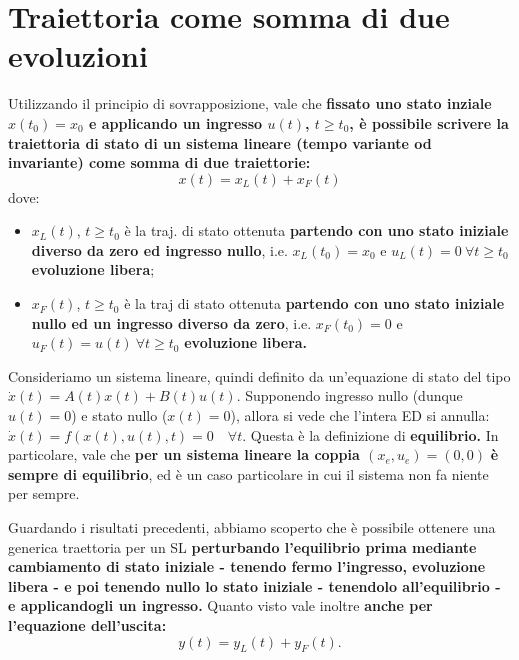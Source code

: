\documentclass[a4paper]{report}
\begin{document}
\section{Traiettoria come somma di due evoluzioni}
\begin{defin}{}{}
Utilizzando il principio di sovrapposizione, vale che \textbf{fissato uno stato inziale $x(t_0) = x_0$ e applicando un ingresso $u(t)$, $t \geq t_0$, è possibile scrivere la traiettoria di stato di un sistema lineare (tempo variante od invariante) come somma di due traiettorie:}
\begin{equation}
	x(t) = x_L(t) +x_F(t)
\end{equation}
dove:
\begin{itemize}
	\item  $x_L(t)$, $t \geq t_0$ è la traj. di stato ottenuta \textbf{partendo con uno stato iniziale diverso da zero ed ingresso nullo}, i.e. $x_L(t_0) = x_0$ e $u_L(t) = 0 \ \forall t \geq t_0$ \rarr \textbf{evoluzione libera};
	\item $x_F(t)$, $t \geq t_0$ è la traj di stato ottenuta \textbf{partendo con uno stato iniziale nullo ed un ingresso diverso da zero}, i.e. $x_F(t_0) = 0$ e $u_F(t) = u(t) \ \forall t \geq t_0$ \rarr \textbf{evoluzione libera.}
\end{itemize}
\end{defin}

\begin{prop}
\label{prop:sl_coppia_nulla_eq}
	Consideriamo un sistema lineare, quindi definito da un'equazione di stato del tipo $\dot x(t) = A(t)x(t) + B(t)u(t).$ Supponendo ingresso nullo (dunque $u(t) = 0$)  e stato nullo ($x(t)=0$), allora si vede che l'intera ED si annulla: $\dot x(t) = f(x(t), u(t), t) = 0 \quad \forall t$. Questa è la definizione di \textbf{equilibrio.} In particolare, vale che \textbf{per un sistema lineare la coppia  $(x_e,u_e) = (0,0)$} \textbf{è sempre di equilibrio}, ed è un caso particolare  in cui il sistema non fa niente per sempre.
\end{prop}

\begin{prop}
	Guardando i risultati precedenti, abbiamo scoperto che è possibile ottenere una generica traettoria per un SL \textbf{perturbando l'equilibrio prima mediante cambiamento di stato iniziale - tenendo fermo l'ingresso, evoluzione libera - e poi tenendo nullo lo stato iniziale -  tenendolo all'equilibrio - e applicandogli un ingresso.} Quanto visto vale inoltre \textbf{anche per l'equazione dell'uscita:}
	\begin{equation}
		y(t) = y_L(t) + y_F(t).
	\end{equation}
\end{prop}
\end{document}
